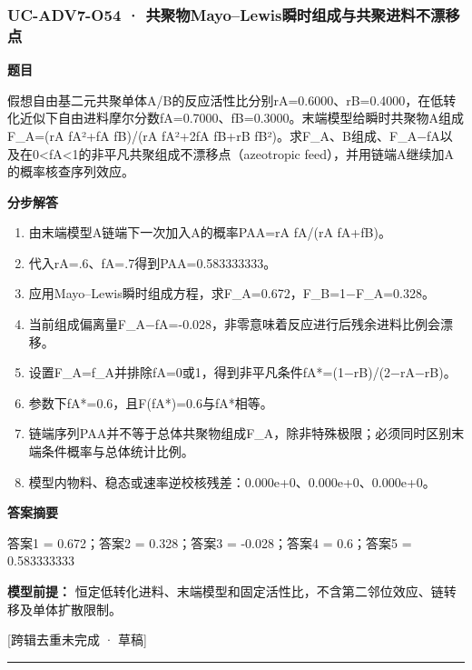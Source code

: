 \documentclass[UTF8,11pt,a4paper]{ctexart}
\begin{document}
\subsubsection*{UC-ADV7-O54 · 共聚物Mayo–Lewis瞬时组成与共聚进料不漂移点}
\noindent\textbf{题目}\par
假想自由基二元共聚单体A/B的反应活性比分别rA=0.6000、rB=0.4000，在低转化近似下自由进料摩尔分数fA=0.7000、fB=0.3000。末端模型给瞬时共聚物A组成F\_A=(rA fA²+fA fB)/(rA fA²+2fA fB+rB fB²)。求F\_A、B组成、F\_A−fA以及在0<fA<1的非平凡共聚组成不漂移点（azeotropic feed），并用链端A继续加A的概率核查序列效应。\par
\medskip\noindent\textbf{分步解答}
\begin{enumerate}
\item 由末端模型A链端下一次加入A的概率PAA=rA fA/(rA fA+fB)。
\item 代入rA=.6、fA=.7得到PAA=0.583333333。
\item 应用Mayo–Lewis瞬时组成方程，求F\_A=0.672，F\_B=1−F\_A=0.328。
\item 当前组成偏离量F\_A−fA=-0.028，非零意味着反应进行后残余进料比例会漂移。
\item 设置F\_A=f\_A并排除fA=0或1，得到非平凡条件fA*=(1−rB)/(2−rA−rB)。
\item 参数下fA*=0.6，且F(fA*)=0.6与fA*相等。
\item 链端序列PAA并不等于总体共聚物组成F\_A，除非特殊极限；必须同时区别末端条件概率与总体统计比例。
\item 模型内物料、稳态或速率逆校核残差：0.000e+0、0.000e+0、0.000e+0。
\end{enumerate}
\noindent\textbf{答案摘要}\par
答案1 = 0.672；答案2 = 0.328；答案3 = -0.028；答案4 = 0.6；答案5 = 0.583333333\par
\noindent\textbf{模型前提：}
恒定低转化进料、末端模型和固定活性比，不含第二邻位效应、链转移及单体扩散限制。\par
\noindent\textcolor{red!65!black}{[跨辑去重未完成 · 草稿]} \par
\medskip\hrule\medskip
{}
\end{document}
